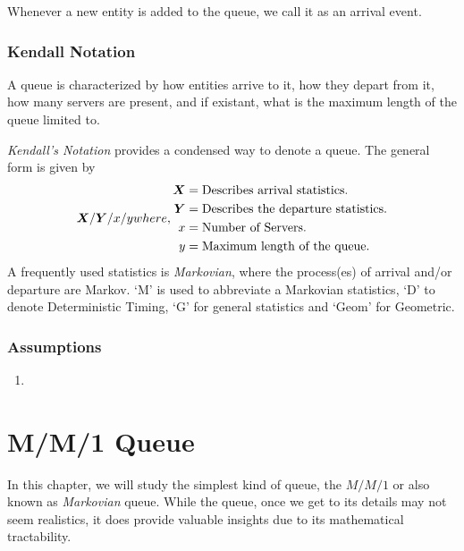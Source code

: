 \documentclass[11pt, a4paper]{report}
\begin{document}
Whenever a new entity is added to the queue, we call it as an arrival event.

\subsection{Kendall Notation}
A queue is characterized by how entities arrive to it, how they depart from it, how many servers are present, and if existant, what is the maximum length of the queue limited to.

\emph{Kendall's Notation} provides a condensed way to denote a queue. The general form is given by 
\begin{subequations}
    \begin{align}
        \mX / \mY / x / y 
    \end{align}
    where, 
    \begin{align*}
        \mX &= \text{Describes arrival statistics.}\\
        \mY &= \text{Describes the departure statistics.} \\
        x &= \text{Number of Servers.}\\
        y &= \text{Maximum length of the queue.} 
    \end{align*}
\end{subequations}
A frequently used statistics is \emph{Markovian}, where the process(es) of arrival and/or departure are Markov. `M' is used to abbreviate a Markovian statistics, `D' to denote Deterministic Timing, `G' for general statistics and `Geom' for Geometric. 

\subsection{Assumptions}

\begin{enumerate}
    \item 
\end{enumerate}

\chapter{M/M/1 Queue}
In this chapter, we will study the simplest kind of queue, the $M/M/1$ or also known as \emph{Markovian} queue. While the queue, once we get to its details may not seem realistics, it does provide valuable insights due to its mathematical tractability.

\end{document}

